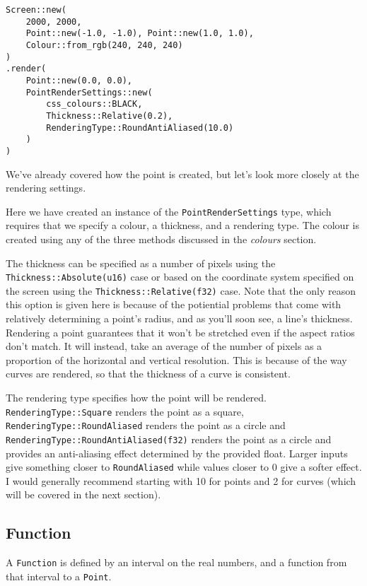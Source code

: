 \begin{lstlisting}
Screen::new(
    2000, 2000,
    Point::new(-1.0, -1.0), Point::new(1.0, 1.0),
    Colour::from_rgb(240, 240, 240)
)
.render(
    Point::new(0.0, 0.0),
    PointRenderSettings::new(
        css_colours::BLACK,
        Thickness::Relative(0.2),
        RenderingType::RoundAntiAliased(10.0)
    )
)
\end{lstlisting}


We've already covered how the point is created, but let's look more closely at the rendering settings.

Here we have created an instance of the \verb|PointRenderSettings| type, which requires that we specify a colour, a thickness, and a rendering type. The colour is created using any of the three methods discussed in the \emph{colours} section.

The thickness can be specified as a number of pixels using the \verb|Thickness::Absolute(u16)| case or based on the coordinate system specified on the screen using the \verb|Thickness::Relative(f32)| case. Note that the only reason this option is given here is because of the potiential problems that come with relatively determining a point's radius, and as you'll soon see, a line's thickness. Rendering a point guarantees that it won't be stretched even if the aspect ratios don't match. It will instead, take an average of the number of pixels as a proportion of the horizontal and vertical resolution. This is because of the way curves are rendered, so that the thickness of a curve is consistent.

The rendering type specifies how the point will be rendered. \verb|RenderingType::Square| renders the point as a square, \verb|RenderingType::RoundAliased| renders the point as a circle and \verb|RenderingType::RoundAntiAliased(f32)| renders the point as a circle and provides an anti-aliasing effect determined by the provided float. Larger inputs give something closer to \verb|RoundAliased| while values closer to 0 give a softer effect. I would generally recommend starting with 10 for points and 2 for curves (which will be covered in the next section).

\subsection{Function}

A \verb|Function| is defined by an interval on the real numbers, and a function from that interval to a \verb|Point|.

